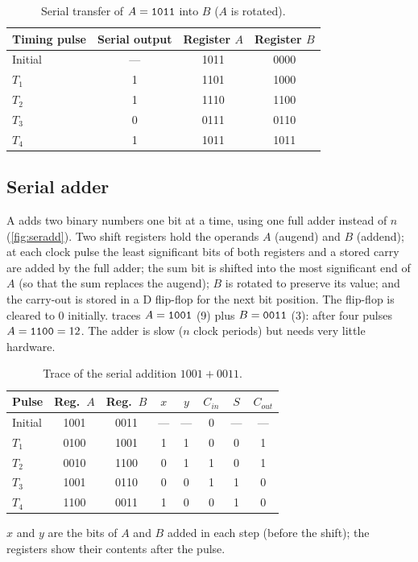 \begin{table}[htbp]
\centering
\caption{Serial transfer of $A=\mathtt{1011}$ into $B$ ($A$ is rotated).}
\label{tab:sertrans}
\begin{tabular}{lccc}
\toprule
Timing pulse & Serial output & Register $A$ & Register $B$\\ \midrule
Initial & --- & 1011 & 0000\\
$T_1$ & 1 & 1101 & 1000\\
$T_2$ & 1 & 1110 & 1100\\
$T_3$ & 0 & 0111 & 0110\\
$T_4$ & 1 & 1011 & 1011\\ \bottomrule
\end{tabular}
\end{table}

\subsection{Serial adder}
A  adds two binary numbers one bit at a time, using one full adder instead of $n$ (\cref{fig:seradd}). Two shift registers hold the operands $A$ (augend) and $B$ (addend); at each clock pulse the least significant bits of both registers and a stored carry are added by the full adder; the sum bit is shifted into the most significant end of $A$ (so that the sum replaces the augend); $B$ is rotated to preserve its value; and the carry-out is stored in a D flip-flop for the next bit position. The flip-flop is cleared to 0 initially.  traces $A=\mathtt{1001}$ (9) plus $B=\mathtt{0011}$ (3): after four pulses $A=\mathtt{1100}=12$. The adder is slow ($n$ clock periods) but needs very little hardware.


\begin{table}[htbp]
\centering
\caption{Trace of the serial addition $1001+0011$.}
\label{tab:seradd}
\begin{tabular}{lcc|ccc|cc}
\toprule
Pulse & Reg.\ $A$ & Reg.\ $B$ & $x$ & $y$ & $C_{in}$ & $S$ & $C_{out}$\\ \midrule
Initial & 1001 & 0011 & --- & --- & 0 & --- & ---\\
$T_1$ & 0100 & 1001 & 1 & 1 & 0 & 0 & 1\\
$T_2$ & 0010 & 1100 & 0 & 1 & 1 & 0 & 1\\
$T_3$ & 1001 & 0110 & 0 & 0 & 1 & 1 & 0\\
$T_4$ & 1100 & 0011 & 1 & 0 & 0 & 1 & 0\\ \bottomrule
\end{tabular}

\smallskip
{\small $x$ and $y$ are the bits of $A$ and $B$ added in each step (before the shift); the registers show their contents after the pulse.}
\end{table}

